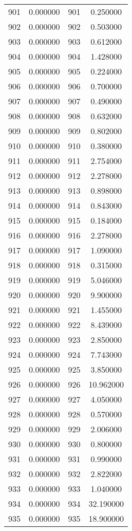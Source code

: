 \documentclass[12pt]{article}
\begin{document}
\begin{longtable}{@{}cccc@{}}
901 & 0.000000 & 901 & 0.250000 \\
902 & 0.000000 & 902 & 0.503000 \\
903 & 0.000000 & 903 & 0.612000 \\
904 & 0.000000 & 904 & 1.428000 \\
905 & 0.000000 & 905 & 0.224000 \\
906 & 0.000000 & 906 & 0.700000 \\
907 & 0.000000 & 907 & 0.490000 \\
908 & 0.000000 & 908 & 0.632000 \\
909 & 0.000000 & 909 & 0.802000 \\
910 & 0.000000 & 910 & 0.380000 \\
911 & 0.000000 & 911 & 2.754000 \\
912 & 0.000000 & 912 & 2.278000 \\
913 & 0.000000 & 913 & 0.898000 \\
914 & 0.000000 & 914 & 0.843000 \\
915 & 0.000000 & 915 & 0.184000 \\
916 & 0.000000 & 916 & 2.278000 \\
917 & 0.000000 & 917 & 1.090000 \\
918 & 0.000000 & 918 & 0.315000 \\
919 & 0.000000 & 919 & 5.046000 \\
920 & 0.000000 & 920 & 9.900000 \\
921 & 0.000000 & 921 & 1.455000 \\
922 & 0.000000 & 922 & 8.439000 \\
923 & 0.000000 & 923 & 2.850000 \\
924 & 0.000000 & 924 & 7.743000 \\
925 & 0.000000 & 925 & 3.850000 \\
926 & 0.000000 & 926 & 10.962000 \\
927 & 0.000000 & 927 & 4.050000 \\
928 & 0.000000 & 928 & 0.570000 \\
929 & 0.000000 & 929 & 2.006000 \\
930 & 0.000000 & 930 & 0.800000 \\
931 & 0.000000 & 931 & 0.990000 \\
932 & 0.000000 & 932 & 2.822000 \\
933 & 0.000000 & 933 & 1.040000 \\
934 & 0.000000 & 934 & 32.190000 \\
935 & 0.000000 & 935 & 18.900000 \\

\end{longtable}
\end{document}
